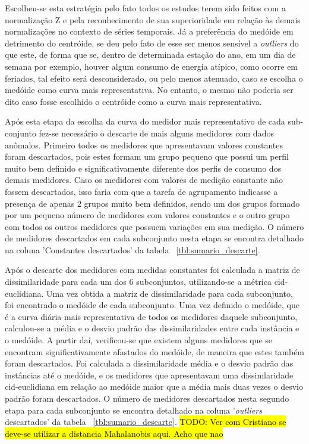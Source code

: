 Escolheu-se esta estratégia pelo fato todos os estudos terem sido feitos com a normalização Z e pela reconhecimento de sua superioridade em relação às demais normalizações no contexto de séries temporais. Já a preferência do medóide em detrimento do centróide, se deu pelo fato de esse ser menos sensível a \emph{outliers} do que este, de forma que se, dentro de determinada estação do ano, em um dia de semana por exemplo, houver algum consumo de energia atípico, como ocorre em feriados, tal efeito será desconsiderado, ou pelo menos atenuado, caso se escolha o medóide como curva mais representativa. No entanto, o mesmo não poderia ser dito caso fosse escolhido o centróide como a curva mais representativa.

Após esta etapa da escolha da curva do medidor mais representativo de cada sub-conjunto fez-se necessário o descarte de mais alguns medidores com dados anômalos. Primeiro todos os medidores que apresentavam valores constantes foram descartados, pois estes formam um grupo pequeno que possui um perfil muito bem definido e significativamente diferente dos perfis de consumo dos demais medidores. Caso os medidores com valores de medição constante não fossem descartados, isso faria com que a tarefa de agrupamento indicasse a presença de apenas $2$ grupos muito bem definidos, sendo um dos grupos formado por um pequeno número de medidores com valores constantes e o outro grupo com todos os outros medidores que possuem variações em sua medição. O número de medidores descartados em cada subconjunto nesta etapa se encontra detalhado na coluna 'Constantes descartados' da tabela ~\ref{tbl:sumario_descarte}.

Após o descarte dos medidores com medidas constantes foi calculada a matriz de dissimilaridade para cada um dos 6 subconjuntos, utilizando-se a métrica cid-euclidiana. Uma vez obtida a matriz de dissimilaridade para cada subconjunto, foi encontrado o medóide de cada subconjunto. Uma vez definido o medóide, que é a curva diária mais representativa de todos os medidores daquele subconjunto, calculou-se a média e o desvio padrão das dissimilaridades entre cada instância e o medóide. A partir daí, verificou-se que existem alguns medidores que se encontram significativamente afastados do medóide, de maneira que estes também foram descartados. Foi calculada a dissimilaridade média e o desvio padrão das instâncias até o medóide, e os medidores que apresentavam uma dissimlaridade cid-euclidiana em relação ao medóide maior que a média mais duas vezes o desvio padrão foram descartados. O número de medidores descartados nesta segundo etapa para cada subconjunto se encontra detalhado na coluna '\emph{outliers} descartados' da tabela ~\ref{tbl:sumario_descarte}. \hl{TODO: Ver com Cristiano se deve-se utilizar a distancia Mahalanobis aqui. Acho que nao}

